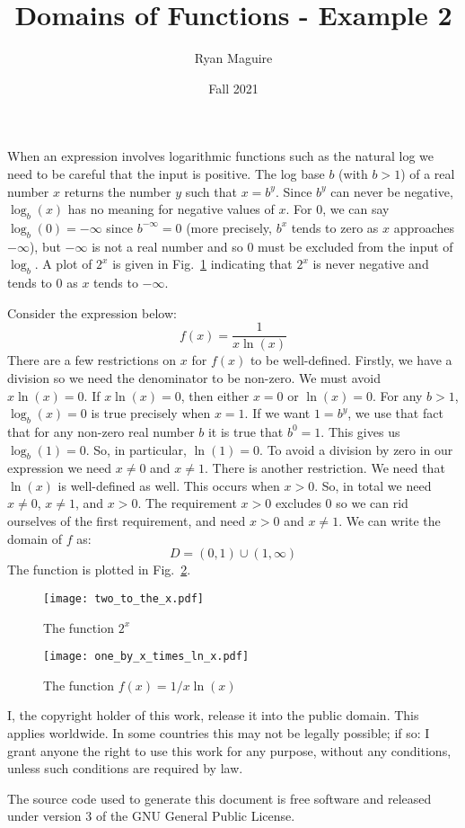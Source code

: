 \documentclass{article}
\title{Domains of Functions - Example 2}
\author{Ryan Maguire}
\date{Fall 2021}
\begin{document}
    \maketitle
    When an expression involves logarithmic functions such as the natural
    log we need to be careful that the input is positive. The log base
    $b$ (with $b>1$) of a real number $x$ returns the number $y$ such that
    $x=b^{y}$. Since $b^{y}$ can never be negative, $\log_{b}(x)$ has no
    meaning for negative values of $x$. For 0, we can say
    $\log_{b}(0)=-\infty$ since $b^{-\infty}=0$ (more precisely, $b^{x}$ tends
    to zero as $x$ approaches $-\infty$), but $-\infty$ is not a real
    number and so 0 must be excluded from the input of $\log_{b}$.
    A plot of $2^{x}$ is given in Fig.~\ref{fig:two_to_the_x} indicating that
    $2^{x}$ is never negative and tends to $0$ as $x$ tends to $-\infty$.
    \par\hfill\par
    Consider the expression below:
    \begin{equation}
        f(x)=\frac{1}{x\ln(x)}
    \end{equation}
    There are a few restrictions on $x$ for $f(x)$ to be well-defined. Firstly,
    we have a division so we need the denominator to be non-zero. We must
    avoid $x\ln(x)=0$. If $x\ln(x)=0$, then either $x=0$ or $\ln(x)=0$. For
    any $b>1$, $\log_{b}(x)=0$ is true precisely when $x=1$. If we want
    $1=b^{y}$, we use that fact that for any non-zero real number $b$ it is
    true that $b^{0}=1$. This gives us $\log_{b}(1)=0$. So, in particular,
    $\ln(1)=0$. To avoid a division by zero in our expression we need
    $x\ne{0}$ and $x\ne{1}$. There is another restriction. We need that
    $\ln(x)$ is well-defined as well. This occurs when $x>0$. So, in total
    we need $x\ne{0}$, $x\ne{1}$, and $x>0$. The requirement $x>0$ excludes
    0 so we can rid ourselves of the first requirement, and need
    $x>0$ and $x\ne{1}$. We can write the domain of $f$ as:
    \begin{equation}
        D=(0,1)\cup(1,\infty)
    \end{equation}
    The function is plotted in Fig.~\ref{fig:one_by_x_lnx}.
    \begin{figure}
        \centering
        \texttt{[image: two\_to\_the\_x.pdf]}
        \caption{The function $2^{x}$}
        \label{fig:two_to_the_x}
    \end{figure}
    \begin{figure}
        \centering
        \texttt{[image: one\_by\_x\_times\_ln\_x.pdf]}
        \caption{The function $f(x)=1/x\ln(x)$}
        \label{fig:one_by_x_lnx}
    \end{figure}
    \newpage
    I, the copyright holder of this work, release it into the public domain.
    This applies worldwide. In some countries this may not be legally possible;
    if so: I grant anyone the right to use this work for any purpose, without
    any conditions, unless such conditions are required by law.
    \par\hfill\par
    The source code used to generate this document is free software and released
    under version 3 of the GNU General Public License.
\end{document}

